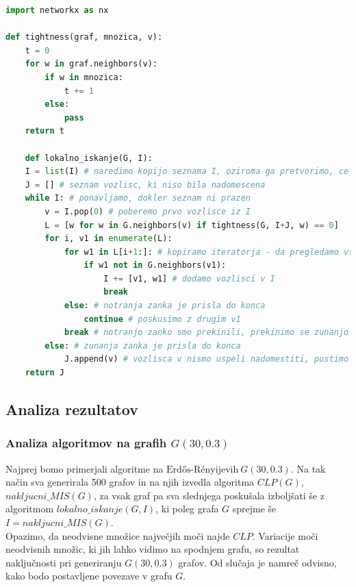 \documentclass[a4paper, 12pt]{article}
\begin{document}
\begin{lstlisting}[language=Python, basicstyle=\tiny]
import networkx as nx

def tightness(graf, mnozica, v): 
    t = 0
    for w in graf.neighbors(v):
        if w in mnozica:
            t += 1
        else:
            pass
    return t

    def lokalno_iskanje(G, I):
    I = list(I) # naredimo kopijo seznama I, oziroma ga pretvorimo, ce ni v obliki seznama
    J = [] # seznam vozlisc, ki niso bila nadomescena
    while I: # ponavljamo, dokler seznam ni prazen
        v = I.pop(0) # poberemo prvo vozlisce iz I
        L = [w for w in G.neighbors(v) if tightness(G, I+J, w) == 0]
        for i, v1 in enumerate(L):
            for w1 in L[i+1:]: # kopiramo iteratorja - da pregledamo vsak par enkrat
                if w1 not in G.neighbors(v1):
                    I += [v1, w1] # dodamo vozlisci v I
                    break
            else: # notranja zanka je prisla do konca
                continue # poskusimo z drugim v1
            break # notranjo zanko smo prekinili, prekinimo se zunanjo
        else: # zunanja zanka je prisla do konca
            J.append(v) # vozlisca v nismo uspeli nadomestiti, pustimo ga v izhodu
    return J
\end{lstlisting}

\subsection{Analiza rezultatov}

\subsubsection{Analiza algoritmov na grafih $G(30, 0.3)$}

Najprej bomo primerjali algoritme na $\text{Erdős-Rényijevih}\ G(30, 0.3)$. Na tak način sva generirala 500 grafov in na njih izvedla algoritma $CLP(G)$, $nakljucni\_MIS(G)$, za vsak graf pa sva slednjega poskušala izboljšati
še z algoritmom $lokalno\_iskanje(G, I)$, ki poleg grafa $G$ sprejme še $I = nakljucni\_MIS(G)$.\\

\noindent Opazimo, da neodvisne množice največjih moči najde $CLP$. Variacije moči neodvisnih množic,
ki jih lahko vidimo na spodnjem grafu, so rezultat naključnosti pri generiranju $G(30, 0.3)$ grafov.
Od slučaja je namreč odvisno, kako bodo postavljene povezave v grafu $G$.
\end{document}
